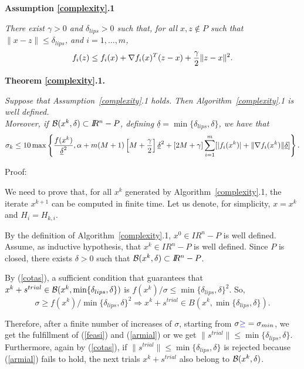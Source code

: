 \documentclass{article}
\newcommand{\R}         {I\!\!R}
\newcommand{\s}{s^{trial}}
\newcommand{\B}{{\cal B}}
\begin{document}
\noindent
{\bf Assumption \ref{complexity}.1}

{\it There exist $\gamma > 0$ and $\delta_{lips} > 0$ such that, for all $x, z \notin P$ such that 
  $\|x-z\| \leq \delta_{lips}$, and $i = 1, \ldots, m$,
\begin{equation} \label{taylor}
 f_i(z) \leq f_i(x) + \nabla f_i(x)^T (z-x) + \frac{\gamma}{2} \|z-x\|^2. \\
\end{equation}
} 


 


\noindent
{\bf Theorem \ref{complexity}.1.} {\it Suppose that Assumption~\ref{complexity}.1 holds. Then Algorithm~\ref{complexity}.1 is well defined.\\
    Moreover, if $\B(x^k, \delta) \subset \R^n - P$, defining $\underline{\delta} = \min\{\delta_{lips},\delta\}$,  
   we have that 
\begin{equation} \label{sigk}
\sigma_k \leq 10 \max \left\{ \frac{f(x^k)}{\underline{\delta}^2},  \alpha +  
 m (M+1) \left[M + \frac{\gamma}{2} \right] \underline{\delta}^2   
           +   \left[2M+\gamma\right] 
\sum_{i=1}^m   [|f_i(x^k)| + \|\nabla f_i(x^k)\| \underline{\delta}]\right\}.    \\
\end{equation}   

                                                                            
\noindent
Proof:} We need to prove that, for all $x^k$ generated by Algorithm~\ref{complexity}.1, the iterate $x^{k+1}$ can be computed
 in finite time. Let us denote, for simplicity, $x = x^k$ and $H_i = H_{k,i}$.      
 
 By the definition of  Algorithm~\ref{complexity}.1, $x^0 \in \R^n - P$ is well defined. Assume, as inductive hypothesis,
  that $x^k \in \R^n - P$ is well defined. Since $P$ is closed, there exists $\delta > 0$ such that $\B(x^k, \delta) \subset \R^n-P$. 

By (\ref{cotas}), a sufficient condition that guarantees that $x^k + \s \in \B(x^k, \min\{\delta_{lips}, \delta\})$ is 
  $f(x^k)/\sigma \leq \min\{\delta_{lips}, \delta\}^2$.
  So,
\begin{equation} \label{simama}
\sigma \geq f(x^k) / \min\{\delta_{lips}, \delta\}^2  \Rightarrow x^k + \s \in B(x^k, \min \{\delta_{lips}, \delta\}).
\end{equation}
 
   Therefore, after a finite number of increases of $\sigma$, starting from $\sigma\textcolor{blue}{\geq}=\sigma_{min}$,
      we get the fulfillment of (\ref{feasi}) and (\ref{armial}) 
   or we get $\|s^{trial}\| \leq \min\{\delta_{lips}, \delta\}$. Furthermore, again by (\ref{cotas}), if
     $\|s^{trial}\| \leq \min\{\delta_{lips}, \delta\}$ is rejected because (\ref{armial}) fails to hold, 
   the next trials $x^k + s^{trial}$ also belong 
  to $\B(x^k, \delta)$.   
\end{document}
